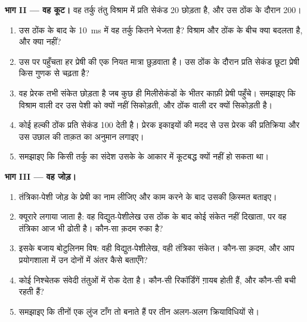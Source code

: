 \begin{problem}
\medskip
\noindent\textbf{भाग II --- वह कूट।}
वह तर्कु तंतु विश्राम में प्रति सेकंड 20  छोड़ता है, और उस ठोंक के
दौरान 200।
\begin{enumerate}[resume]
  \item उस ठोंक के बाद के \qty{10}{ms} में वह तर्कु कितने  भेजता
        है? विश्राम और ठोंक के बीच क्या बदलता है, और क्या नहीं?
  \item उस  पर पहुँचता हर  प्रेषी की एक नियत मात्रा
        छुड़वाता है। उस ठोंक के दौरान प्रति सेकंड छूटा प्रेषी किस गुणक से
        चढ़ता है?
  \item वह प्रेरक  तभी संकेत छोड़ता है जब कुछ ही मिलीसेकंडों के भीतर
        काफ़ी प्रेषी पहुँचे। समझाइए कि विश्राम वाली दर उस पेशी को क्यों
        नहीं सिकोड़ती, और ठोंक वाली दर क्यों सिकोड़ती है।
  \item कोई हल्की ठोंक प्रति सेकंड 100 देती है। प्रेरक इकाइयों की मदद से उस
        प्रेरक  की प्रतिक्रिया और उस उछाल की ताक़त का अनुमान लगाइए।
  \item समझाइए कि किसी तर्कु का संदेश उसके  के आकार में
        कूटबद्ध क्यों नहीं हो सकता था।
\end{enumerate}

\medskip
\noindent\textbf{भाग III --- वह जोड़।}
\begin{enumerate}[resume]
  \item तंत्रिका-पेशी जोड़ के प्रेषी का नाम लीजिए और काम करने के बाद उसकी
        क़िस्मत बताइए।
  \item क्यूरारे लगाया जाता है: वह विद्युत-पेशीलेख उस ठोंक के बाद कोई संकेत
        नहीं दिखाता, पर वह तंत्रिका आज भी  ढोती है। कौन-सा क़दम
        रुका है?
  \item इसके बजाय बोटुलिनम विष: वही विद्युत-पेशीलेख, वही तंत्रिका संकेत।
        कौन-सा क़दम, और आप प्रयोगशाला में उन दोनों में अंतर कैसे बताएँगे?
  \item कोई निश्चेतक संवेदी तंतुओं में  रोक देता है। कौन-सी
        रिकॉर्डिंगें ग़ायब होती हैं, और कौन-सी बची रहती हैं?
  \item समझाइए कि तीनों एक लुंज टाँग तो बनाते हैं पर तीन अलग-अलग
        क्रियाविधियों से।
\end{enumerate}


\end{problem}

